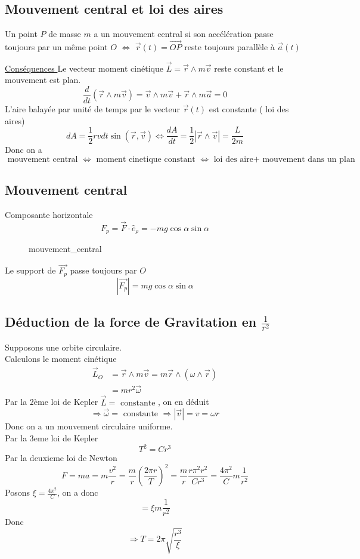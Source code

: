 \documentclass[../main.tex]{subfiles}
\begin{document}
\subsection{Mouvement central et loi des aires}
\begin{defn}
	Un point $P$ de masse $m$ a un mouvement central si son accélération passe toujours par un même point $O$ $\iff$ $\vec{r}( t) = \vec{OP}$ reste toujours parallèle à $\vec{a}( t) $
\end{defn}
\underline{ Conséquences }
Le vecteur moment cinétique $\vec{L}= \vec{r} \land m \vec{v}$ reste constant et le mouvement est plan.
\[ 
	\frac{d}{dt} ( \vec{r} \land m \vec{v}) = \vec{v} \land m \vec{v} + \vec{r} \land m \vec{a} = 0
\]
L'aire balayée par unité de temps par le vecteur $\vec{r}( t) $ est constante ( loi des aires) 
\[ 
	d A = \frac{1}{2} r v dt \sin( \vec{r}, \vec{v}) \iff \frac{dA}{dt} = \frac{1}{2}|\vec{r}\land \vec{v}| = \frac{L}{2m}
\]
Donc on a
\[ 
\text{ mouvement central } \iff \text{ moment cinetique constant } \iff \text{ loi des aire+ mouvement dans un plan } 
\]
\subsection{Mouvement central}
Composante horizontale
\[ 
	F_p = \vec{F} \cdot \hat{e}_{\rho} = - mg \cos\alpha\sin \alpha
\]


\begin{figure}[ht]
    \centering
    \caption{mouvement_central}
    \label{fig:mouvement_central}
\end{figure}
Le support de $\vec{F_p}$ passe toujours par $O$ 
\[ 
|\vec{F_p}| = mg \cos \alpha \sin\alpha
\]
\subsection{Déduction de la force de Gravitation en $\frac{1}{r^{2}}$}
Supposons une orbite circulaire.\\
Calculons le moment cinétique
\begin{align*}
	\vec{L}_O &= \vec{r} \land m \vec{v} = m \vec{r} \land ( \omega \land \vec{r}) \\
		  &= m r^{2} \vec{\omega}
\end{align*}
Par la 2ème loi de Kepler
$\vec{L} = \text{ constante } $, on en déduit
\[ 
\Rightarrow  \vec{\omega} = \text{ constante } \Rightarrow |\vec{v}| = v = \omega r
\]
Donc on a un mouvement circulaire uniforme.\\
Par la 3eme loi de Kepler
\[ 
T^{2} = C r^{3}
\]
Par la deuxieme loi de Newton
\[ 
	F= ma = m \frac{v^{2}}{r} = \frac{m}{r} ( \frac{2 \pi r}{T}) ^{2} = \frac{m}{r} \frac{r \pi^{2} r^{2}}{C r^{3}} = \frac{4 \pi^{2}}{C} m \frac{1}{r^{2}}
\]
Posons $\xi = \frac{4\pi^{2}}{C}$, on a donc
\[ 
=\xi m \frac{1}{r^{2}}
\]
Donc
\[ 
	\Rightarrow T = 2 \pi \sqrt{\frac{r^{3}}{\xi}}
\]
\end{document}
